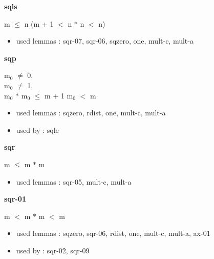 \documentclass[a4paper]{article}
\begin{document}
\medskip

\bigskip

{\large\bf sqls}

\medskip

 \Fol m $\le$ n \Imp (m + 1 $<$ n $*$ n  $<$ n)

\begin{itemize}


\item       used lemmas  : sqr-07, sqr-06, sqzero, one, mult-c, mult-a

\end{itemize}

\medskip

\bigskip

{\large\bf sqp}

\medskip

$\mbox{m}_{0}$ $\neq$ 0, \\
$\mbox{m}_{0}$ $\neq$ 1, \\
$\mbox{m}_{0}$ $*$ $\mbox{m}_{0}$ $\le$ m + 1 \Fol $\mbox{m}_{0}$ $<$ m

\begin{itemize}


\item       used lemmas  : sqzero, rdist, one, mult-c, mult-a
\item       used by      : sqle

\end{itemize}

\medskip

\bigskip

{\large\bf sqr}

\medskip

 \Fol m $\le$ m $*$ m

\begin{itemize}


\item       used lemmas  : sqr-05, mult-c, mult-a

\end{itemize}

\medskip

\bigskip

{\large\bf sqr-01}

\medskip

 \Fol m $<$ m $*$ m  $<$ m

\begin{itemize}


\item       used lemmas  : sqzero, sqr-06, rdist, one, mult-c, mult-a, ax-01
\item       used by      : sqr-02, sqr-09

\end{itemize}
\end{document}
